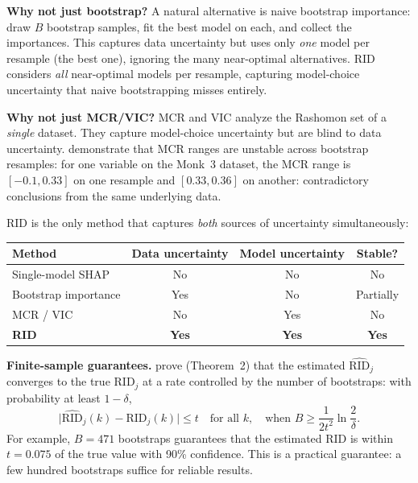 \textbf{Why not just bootstrap?}  A natural alternative is naive bootstrap
importance: draw $B$ bootstrap samples, fit the best model on each, and
collect the importances.  This captures data uncertainty but uses only
\emph{one} model per resample (the best one), ignoring the many
near-optimal alternatives.  RID considers \emph{all} near-optimal models
per resample, capturing model-choice uncertainty that naive bootstrapping
misses entirely.

\textbf{Why not just MCR/VIC?}  MCR and VIC analyze the Rashomon set of a
\emph{single} dataset.  They capture model-choice uncertainty but are
blind to data uncertainty.  \citet{DonnellyEtAl2023} demonstrate that MCR
ranges are unstable across bootstrap resamples: for one variable on the
Monk~3 dataset, the MCR range is $[-0.1, 0.33]$ on one resample and
$[0.33, 0.36]$ on another: contradictory conclusions from the same
underlying data.

\begin{keyidea}[RID = Bootstrap $\times$ Rashomon]
RID is the only method that captures \emph{both} sources of uncertainty
simultaneously:
\begin{center}
\begin{tabular}{lccc}
\toprule
\textbf{Method} & \textbf{Data uncertainty} & \textbf{Model uncertainty}
  & \textbf{Stable?} \\
\midrule
Single-model SHAP & No  & No  & No \\
Bootstrap importance & Yes & No  & Partially \\
MCR / VIC            & No  & Yes & No \\
\textbf{RID}         & \textbf{Yes} & \textbf{Yes} & \textbf{Yes} \\
\bottomrule
\end{tabular}
\end{center}
\end{keyidea}

\textbf{Finite-sample guarantees.}  \citet{DonnellyEtAl2023} prove
(Theorem~2) that the estimated $\widehat{\text{RID}}_j$ converges to the
true $\text{RID}_j$ at a rate controlled by the number of bootstraps:
with probability at least $1 - \delta$,
\[
  \bigl|\widehat{\text{RID}}_j(k) - \text{RID}_j(k)\bigr| \leq t
  \quad \text{for all } k,
  \quad \text{when } B \geq \frac{1}{2t^2}\ln\frac{2}{\delta}.
\]
For example, $B = 471$ bootstraps guarantees that the estimated RID is
within $t = 0.075$ of the true value with 90\% confidence.  This is a
practical guarantee: a few hundred bootstraps suffice for reliable results.

